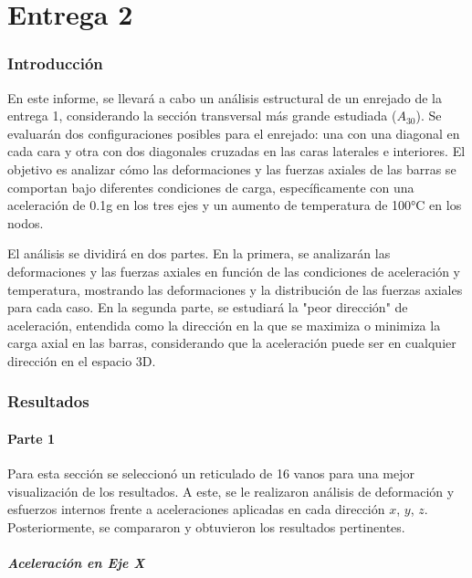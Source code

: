 \part{Entrega 2}

\section{Introducción}

En este informe, se llevará a cabo un análisis estructural de un enrejado de la entrega 1, considerando la sección transversal más grande estudiada (\(A_{30}\)). Se evaluarán dos configuraciones posibles para el enrejado: una con una diagonal en cada cara y otra con dos diagonales cruzadas en las caras laterales e interiores. El objetivo es analizar cómo las deformaciones y las fuerzas axiales de las barras se comportan bajo diferentes condiciones de carga, específicamente con una aceleración de 0.1g en los tres ejes y un aumento de temperatura de 100°C en los nodos.

El análisis se dividirá en dos partes. En la primera, se analizarán las deformaciones y las fuerzas axiales en función de las condiciones de aceleración y temperatura, mostrando las deformaciones y la distribución de las fuerzas axiales para cada caso. En la segunda parte, se estudiará la "peor dirección" de aceleración, entendida como la dirección en la que se maximiza o minimiza la carga axial en las barras, considerando que la aceleración puede ser en cualquier dirección en el espacio 3D.

\section{Resultados}

\subsection{Parte 1}

Para esta sección se seleccionó un reticulado de 16 vanos para una mejor visualización de los resultados. A este, se le realizaron análisis de deformación y esfuerzos internos frente a aceleraciones aplicadas en cada dirección $x$, $y$, $z$. Posteriormente, se compararon y obtuvieron los resultados pertinentes.

\subsubsection{Aceleración en Eje X}

